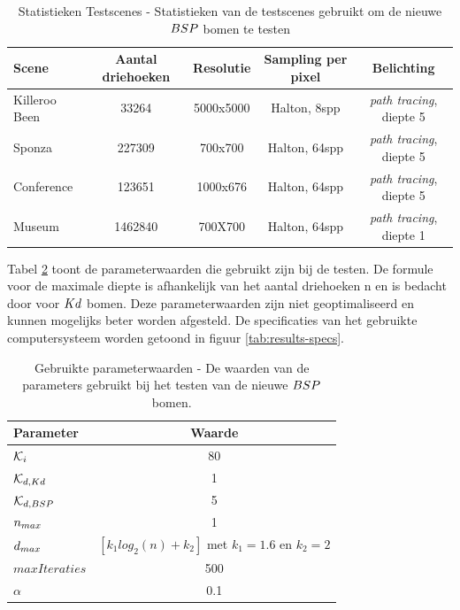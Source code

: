 \begin{table}
  \centering
  \begin{tabular}{@{}lcccc@{}} \toprule
  Scene & Aantal driehoeken & Resolutie & Sampling per pixel & Belichting\\ \midrule
  Killeroo Been & 33264 & 5000x5000 & Halton, 8spp & \textit{path tracing}, diepte 5\\
  Sponza & 227309 & 700x700 & Halton, 64spp & \textit{path tracing}, diepte 5\\
  Conference & 123651 & 1000x676 & Halton, 64spp & \textit{path tracing}, diepte 5\\
  Museum & 1462840 & 700X700 & Halton, 64spp & \textit{path tracing}, diepte 1\\ \bottomrule
 \end{tabular}
  \caption[Statistieken Testscenes]{Statistieken Testscenes - \small Statistieken van de testscenes gebruikt om de nieuwe $BSP$ bomen te testen}
  \label{tab:results-statistics-scenes}
\end{table}

Tabel \ref{tab:results-parameters} toont de parameterwaarden die gebruikt zijn bij de testen. De formule voor de maximale diepte is afhankelijk van het aantal driehoeken n en is bedacht door \authorHavranBittner{} \cite{havran2002improving} voor $Kd$ bomen. Deze parameterwaarden zijn niet geoptimaliseerd en kunnen mogelijks beter worden afgesteld.
De specificaties van het gebruikte computersysteem worden getoond in figuur \ref{tab:results-specs}.
\begin{table}
  \centering
  \begin{tabular}{@{}lc@{}} \toprule
  Parameter & Waarde \\ \midrule
  $\mathcal{K}_i$ & 80 \\
  $\mathcal{K}_{d,Kd}$ & 1 \\
  $\mathcal{K}_{d,BSP}$ & 5 \\
  $n_{max}$ & 1 \\
  $d_{max}$ & $[k_1log_2(n) + k_2]$ met $k_1 = 1.6$ en $k_2 = 2$ \\
  $maxIteraties$ & 500 \\
  $\alpha$ & 0.1 \\
  \bottomrule
 \end{tabular}
  \caption[Gebruikte parameterwaarden]{Gebruikte parameterwaarden - \small De waarden van de parameters gebruikt bij het testen van de nieuwe $BSP$ bomen.}
  \label{tab:results-parameters}
\end{table}

